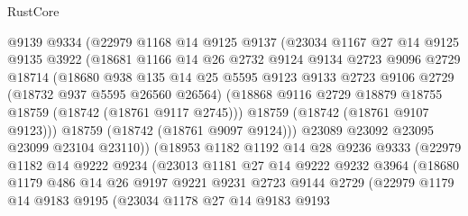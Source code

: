 \begin{lexlean}{RustCore}
\begin{coremodule}
                @9139
                @9334
                (@22979
                  @1168
                  @14
                  @9125
                  @9137
                  (@23034
                    @1167
                    @27
                    @14
                    @9125
                    @9135
                    @3922
                    (@18681
                      @1166
                      @14
                      @26
                      @2732
                      @9124
                      @9134
                      @2723
                      @9096
                      @2729
                      @18714
                      (@18680
                        @938
                        @135
                        @14
                        @25
                        @5595
                        @9123
                        @9133
                        @2723
                        @9106
                        @2729
                        (@18732 @937 @5595 @26560 @26564)
                        (@18868 @9116 @2729 @18879 @18755 @18759 (@18742 (@18761 @9117 @2745)))
                        @18759
                        (@18742 (@18761 @9107 @9123)))
                      @18759
                      (@18742 (@18761 @9097 @9124)))
                    @23089
                    @23092
                    @23095
                    @23099
                    @23104
                    @23110))
                (@18953
                  @1182
                  @1192
                  @14
                  @28
                  @9236
                  @9333
                  (@22979
                    @1182
                    @14
                    @9222
                    @9234
                    (@23013
                      @1181
                      @27
                      @14
                      @9222
                      @9232
                      @3964
                      (@18680
                        @1179
                        @486
                        @14
                        @26
                        @9197
                        @9221
                        @9231
                        @2723
                        @9144
                        @2729
                        (@22979
                          @1179
                          @14
                          @9183
                          @9195
                          (@23034
                            @1178
                            @27
                            @14
                            @9183
                            @9193

\end{coremodule}
\end{lexlean}
